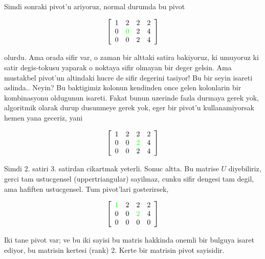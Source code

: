 \documentclass[12pt,fleqn]{article}\usepackage{../common}
\begin{document}
Simdi sonraki pivot'u ariyoruz, normal durumda bu pivot

$$ 
\left[\begin{array}{rrrr}
1 & 2 & 2 & 2  \\
0 & \textcolor{green}{0} & 2 & 4 \\
0 & 0 & 2 & 4
\end{array}\right]
 $$

olurdu. Ama orada sifir var, o zaman bir alttaki satira bakiyoruz, ki
umuyoruz ki satir degis-tokusu yaparak o noktaya sifir olmayan bir deger
gelsin. Ama mustakbel pivot'un altindaki hucre de sifir degerini tasiyor!
Bu bir seyin isareti aslinda.. Neyin? Bu baktigimiz kolonun kendinden once
gelen kolonlarin bir kombinasyonu oldugunun isareti. Fakat bunun uzerinde
fazla durmaya gerek yok, algoritmik olarak durup dusunmeye gerek yok, eger
bir pivot'u kullanamiyorsak hemen yana geceriz, yani

$$ 
\left[\begin{array}{rrrr}
1 & 2 & 2 & 2  \\
0 & 0 & \textcolor{green}{2} & 4 \\
0 & 0 & 2 & 4
\end{array}\right]
 $$

Simdi 2. satiri 3. satirdan cikartmak yeterli. Sonuc altta. Bu matrise $U$
diyebiliriz, gerci tam ustucgensel (uppertriangular) sayilmaz, cunku
sifir dengesi tam degil, ama hafiften ustucgensel. Tum pivot'lari
gosterirsek, 

$$ 
\left[\begin{array}{rrrr}
\textcolor{green}{1} & 2 & 2 & 2  \\
0 & 0 & \textcolor{green}{2} & 4 \\
0 & 0 & 0 & 0
\end{array}\right]
 $$

Iki tane pivot var; ve bu iki sayisi bu matris hakkinda onemli bir bulguya
isaret ediyor, bu matrisin kertesi (rank) 2. Kerte bir matrisin pivot
sayisidir. 
\end{document}
